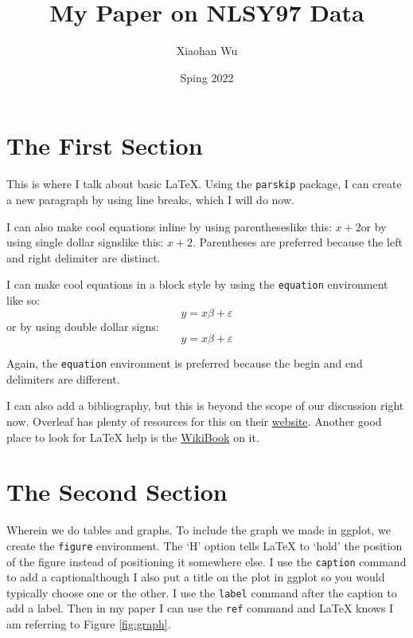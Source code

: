\documentclass{article}
\author{Xiaohan Wu}
\title{My Paper on NLSY97 Data}
\date{Sping 2022}
\begin{document}
\maketitle

\section{The First Section}

This is where I talk about basic \LaTeX. Using the \texttt{parskip} package, I can create a new paragraph by using line breaks, which I will do now.

I can also make cool equations inline by using parentheses{\textemdash}like this: \(x + 2\){\textemdash}or by using single dollar signs{\textemdash}like this: $x+2$. Parentheses are preferred because the left and right delimiter are distinct.

I can make cool equations in a block style by using the \texttt{equation} environment like so:
\begin{equation*}
    y = x\beta + \varepsilon
\end{equation*}
or by using double dollar signs:
$$
    y = x\beta + \varepsilon
$$

Again, the \texttt{equation} environment is preferred because the begin and end delimiters are different.

I can also add a bibliography, but this is beyond the scope of our discussion right now. Overleaf has plenty of resources for this on their \href{https://www.overleaf.com/learn}{website}. Another good place to look for LaTeX help is the \href{https://en.wikibooks.org/wiki/LaTeX}{WikiBook} on it.

\newpage

\section{The Second Section}

Wherein we do tables and graphs. To include the graph we made in ggplot, we create the \texttt{figure} environment. The `H' option tells LaTeX to `hold' the position of the figure instead of positioning it somewhere else. I use the \texttt{caption} command to add a caption{\textemdash}although I also put a title on the plot in ggplot so you would typically choose one or the other. I use the \texttt{label} command after the caption to add a label. Then in my paper I can use the \texttt{ref} command and LaTeX knows I am referring to Figure \ref{fig:graph}.
\end{document}
